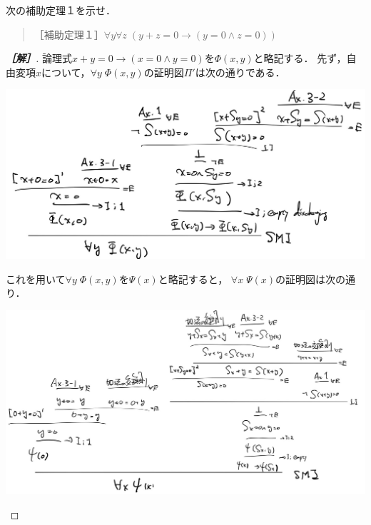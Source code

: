 \documentclass[uplatex,dvipdfmx]{jsarticle}
\begin{document}
\begin{problem}
    次の補助定理１を示せ．
    \begin{quote}
        ［補助定理１］$\forall y\forall z\;(y+z=0\to (y=0\land z=0))$
    \end{quote}
\end{problem}
\begin{proof}[\bf{［解］}]
    論理式$x+y=0\to(x=0\land y=0)$を$\Phi(x,y)$と略記する．
    先ず，自由変項$x$について，$\forall y\;\Phi(x,y)$の証明図$\Pi'$は次の通りである．
    \begin{center}
        \includegraphics[width=15cm]{figure3-1.jpg}
    \end{center}
    これを用いて$\forall y\;\Phi(x,y)$を$\Psi(x)$と略記すると，
    $\forall x\;\Psi(x)$の証明図は次の通り．
    \begin{center}
        \includegraphics[width=15cm]{figure3-2.jpg}
    \end{center}
\end{proof}
\end{document}
